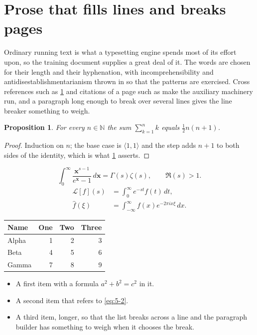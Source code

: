 \documentclass[11pt,a4paper]{report}
\theoremstyle{plain}
\newtheorem{proposition}{Proposition}[chapter]
\newcommand{\vecn}[1]{\mathbf{#1}}
\newcommand{\pairs}[2]{\langle #1,#2\rangle}
\begin{document}
\section{Prose that fills lines and breaks pages}
\label{sec:prose5-2}
Ordinary running text is what a typesetting engine spends most of its effort
upon, so the training document supplies a great deal of it. The words are
chosen for their length and their hyphenation, with incomprehensibility and
antidisestablishmentarianism thrown in so that the patterns are exercised.
Cross references such as \cref{sec:prose5-2} and citations of a page such
as \pageref{sec:prose5-2} make the auxiliary machinery run, and a
paragraph long enough to break over several lines gives the line breaker
something to weigh.
\begin{proposition}\label{prop:5-2}
For every $n\in\mathbb{N}$ the sum $\sum_{k=1}^{n}k$ equals
$\tfrac{1}{2}n(n+1)$.
\end{proposition}
\begin{proof}
Induction on $n$; the base case is $\pairs{1}{1}$ and the step adds $n+1$ to
both sides of the identity, which is what \cref{prop:5-2} asserts.
\end{proof}
\begin{equation}\label{eq:5-2}
  \int_{0}^{\infty}\frac{\vecn{x}^{s-1}}{e^{\vecn{x}}-1}\,d\vecn{x}
    = \Gamma(s)\zeta(s),\qquad \Re(s)>1 .
\end{equation}
\begin{align}
  \mathcal{L}[f](s) &= \int_{0}^{\infty} e^{-st} f(t)\,dt, \\
  \widehat{f}(\xi)  &= \int_{-\infty}^{\infty} f(x) e^{-2\pi i x\xi}\,dx .
\end{align}
\par\noindent\begin{center}
\begin{tabular}{lrrr}
\hline
Name & One & Two & Three \\
\hline
Alpha & 1 & 2 & 3 \\
Beta & 4 & 5 & 6 \\
Gamma & 7 & 8 & 9 \\
\hline
\end{tabular}
\end{center}
\begin{itemize}
  \item A first item with a formula $a^2+b^2=c^2$ in it.
  \item A second item that refers to \eqref{eq:5-2}.
  \item A third item, longer, so that the list breaks across a line and the
    paragraph builder has something to weigh when it chooses the break.
\end{itemize}
\end{document}
